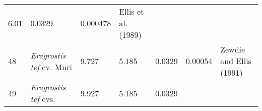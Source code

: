 \documentclass[]{article}
\begin{document}
\begin{longtable}[]{@{}lllllll@{}}
\begin{minipage}[t]{0.08\columnwidth}
6.01\strut
\end{minipage} & \begin{minipage}[t]{0.08\columnwidth}\raggedright
0.0329\strut
\end{minipage} & \begin{minipage}[t]{0.08\columnwidth}\raggedright
0.000478\strut
\end{minipage} & \begin{minipage}[t]{0.23\columnwidth}\raggedright
Ellis et al. (1989)\strut
\end{minipage}\tabularnewline
\begin{minipage}[t]{0.05\columnwidth}\raggedright
48\strut
\end{minipage} & \begin{minipage}[t]{0.23\columnwidth}\raggedright
\emph{Eragrostis tef }cv. Muri\strut
\end{minipage} & \begin{minipage}[t]{0.05\columnwidth}\raggedright
9.727\strut
\end{minipage} & \begin{minipage}[t]{0.08\columnwidth}\raggedright
5.185\strut
\end{minipage} & \begin{minipage}[t]{0.08\columnwidth}\raggedright
0.0329\strut
\end{minipage} & \begin{minipage}[t]{0.08\columnwidth}\raggedright
0.00054\strut
\end{minipage} & \begin{minipage}[t]{0.23\columnwidth}\raggedright
Zewdie and Ellis (1991)\strut
\end{minipage}\tabularnewline
\begin{minipage}[t]{0.05\columnwidth}\raggedright
49\strut
\end{minipage} & \begin{minipage}[t]{0.23\columnwidth}\raggedright
\emph{Eragrostis tef }cvs.\strut
\end{minipage} & \begin{minipage}[t]{0.05\columnwidth}\raggedright
9.927\strut
\end{minipage} & \begin{minipage}[t]{0.08\columnwidth}\raggedright
5.185\strut
\end{minipage} & \begin{minipage}[t]{0.08\columnwidth}\raggedright
0.0329\strut
\end{minipage} & \begin{minipage}[t]{0.08\columnwidth}\raggedright

\end{minipage}
\end{longtable}
\end{document}
